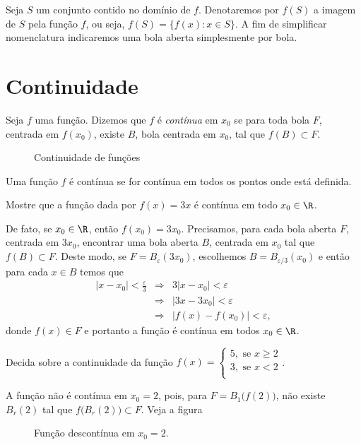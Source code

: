 \documentclass[11pt, oneside, a4paper]{gsm-l}
\begin{document}
Seja $S$ um conjunto contido no domínio de $f$. Denotaremos por $f(S)$ a
imagem de $S$ pela função $f$, ou seja, $f(S)=\big\{f(x): x\in
S\big\}$. A fim de simplificar nomenclatura indicaremos uma bola aberta
simplesmente por bola.

\section{Continuidade}\label{revcalc:cont}
\begin{defi}
  Seja $f$ uma função. Dizemos que $f$ é
  \emph{contínua} em $x_0$ se para toda bola $F$,
  centrada em $f(x_0)$, existe $B$, bola centrada em $x_0$, tal que
  $f(B)\subset F$.
\end{defi}

\begin{figure}[!h]
  \centering
  \caption{Continuidade de funções}
\end{figure}

\begin{defi}
  Uma função $f$ é contínua se for contínua em todos os pontos onde está
  definida.
\end{defi}

\begin{exem}
  Mostre que a função dada por $f(x) = 3x$ é contínua em todo
  $x_0\in\R$.

  De fato, se $x_0\in\R$, então $f(x_0)=3x_0$. Precisamos, para cada
  bola aberta $F$, centrada em $3x_0$, encontrar uma bola aberta $B$,
  centrada em $x_0$ tal que $f(B)\subset F$. Deste modo, se
  $F=B_\varepsilon(3x_0)$, escolhemos $B=B_{\varepsilon\slash 3}(x_0)$ e
  então para cada $x\in B$ temos que
  \begin{eqnarray*}
    |x-x_0|<\frac{\varepsilon}{3}&\Rightarrow&3|x-x_0|<\varepsilon\\
    &\Rightarrow&|3x-3x_0|<\varepsilon\\
    &\Rightarrow&|f(x)-f(x_0)|<\varepsilon,
  \end{eqnarray*}
  donde $f(x)\in F$ e portanto a função é contínua em todos $x_0\in\R$.
\end{exem}

\begin{exem}
  Decida sobre a continuidade da função $f(x)=
  \begin{cases}
    5, \mbox{ se }x \geq 2\\
    3, \mbox{ se }x < 2\\
  \end{cases}$.

  A função não é contínua em $x_0=2$, pois, para $F=B_1\big(f(2)\big)$,
  não existe $B_r(2)$ tal que $f\big(B_r(2)\big)\subset F$. Veja a
  figura 

  \begin{figure}[h]
    \centering
    
    \caption{Função descontínua em $x_0=2$.}
    \label{fig:funcdescexem}
  \end{figure}
\end{exem}
\end{document}
